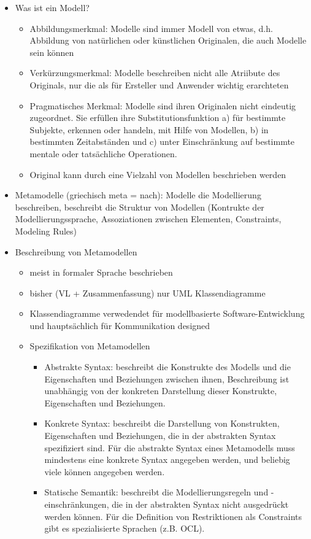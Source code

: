 \documentclass[paper=a4, fontsize=11pt]{scrartcl} %
\numberwithin{equation}{section} %
\numberwithin{figure}{section} %
\numberwithin{table}{section} %
\begin{document}
\begin{itemize}
  \item Was ist ein Modell?
  \begin{itemize}
    \item Abbildungsmerkmal: Modelle sind immer Modell von etwas, d.h. Abbildung von natürlichen oder künstlichen Originalen, die auch Modelle sein können
    \item Verkürzungsmerkmal: Modelle beschreiben nicht alle Atriibute des Originals, nur die als für Ersteller und Anwender wichtig erarchteten
    \item Pragmatisches Merkmal: Modelle sind ihren Originalen nicht eindeutig zugeordnet. Sie erfüllen ihre Substitutionsfunktion a) für bestimmte Subjekte, erkennen oder handeln, mit Hilfe von Modellen, b) in bestimmten Zeitabständen und c) unter Einschränkung auf bestimmte mentale oder tatsächliche Operationen.
    \item Original kann durch eine Vielzahl von Modellen beschrieben werden
  \end{itemize}
  \item Metamodelle (griechisch meta = nach): Modelle die Modellierung beschreiben, beschreibt die Struktur von Modellen (Kontrukte der Modellierungssprache, Assoziationen zwischen Elementen, Constraints, Modeling Rules)
  \item Beschreibung von Metamodellen
  \begin{itemize}
    \item meist in formaler Sprache beschrieben
    \item bisher (VL + Zusammenfassung) nur UML Klassendiagramme
    \item Klassendiagramme verwedendet für modellbasierte Software-Entwicklung und hauptsächlich für Kommunikation designed
    \item Spezifikation von Metamodellen
    \begin{itemize}
      \item Abstrakte Syntax: beschreibt die Konstrukte des Modells und die Eigenschaften und Beziehungen zwischen ihnen, Beschreibung ist unabhängig von der konkreten Darstellung dieser Konstrukte, Eigenschaften und Beziehungen.
      \item Konkrete Syntax: beschreibt die Darstellung von Konstrukten, Eigenschaften und Beziehungen, die in der abstrakten Syntax spezifiziert sind. Für die abstrakte Syntax eines Metamodells muss mindestens eine konkrete Syntax angegeben werden, und beliebig viele können angegeben werden.
      \item Statische Semantik: beschreibt die Modellierungsregeln und -einschränkungen, die in der abstrakten Syntax nicht ausgedrückt werden können. Für die Definition von Restriktionen als Constraints gibt es spezialisierte Sprachen (z.B. OCL).

\end{itemize}
\end{itemize}
\end{itemize}
\end{document}
